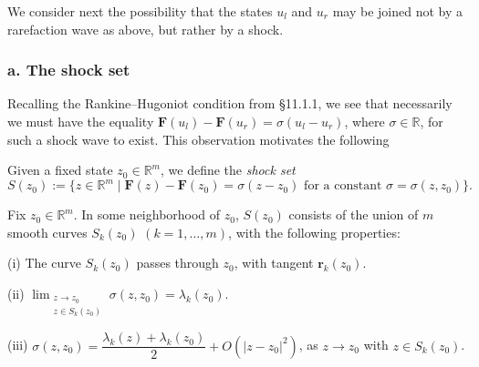 We consider next the possibility that the states $u_l$ and $u_r$ may be joined not by a rarefaction wave as above, but rather by a shock.

\begin{figure}[h]\centering
\end{figure}

\subsubsection*{a. The shock set}

Recalling the Rankine--Hugoniot condition from \S11.1.1, we see that necessarily we must have the equality $\mathbf{F}(u_l) - \mathbf{F}(u_r) = \sigma(u_l - u_r)$, where $\sigma\in\mathbb{R}$, for such a shock wave to exist. This observation motivates the following

\begin{definition}
\label{def:shock-set}
Given a fixed state $z_0\in\mathbb{R}^m$, we define the \textit{shock set}
$$S(z_0) := \{z\in\mathbb{R}^m \mid \mathbf{F}(z) - \mathbf{F}(z_0) = \sigma(z-z_0) \text{ for a constant } \sigma = \sigma(z,z_0)\}.$$
\end{definition}

\begin{theorem}
\label{thm:structure-of-shock-set}
Fix $z_0\in\mathbb{R}^m$. In some neighborhood of $z_0$, $S(z_0)$ consists of the union of $m$ smooth curves $S_k(z_0)$ $(k=1,\ldots,m)$, with the following properties:

(i) The curve $S_k(z_0)$ passes through $z_0$, with tangent $\mathbf{r}_k(z_0)$.

(ii) $\displaystyle\lim_{\substack{z\to z_0 \\ z\in S_k(z_0)}} \sigma(z,z_0) = \lambda_k(z_0)$.

(iii) $\sigma(z,z_0) = \dfrac{\lambda_k(z)+\lambda_k(z_0)}{2} + O(|z-z_0|^2)$, as $z\to z_0$ with $z\in S_k(z_0)$.
\end{theorem}

